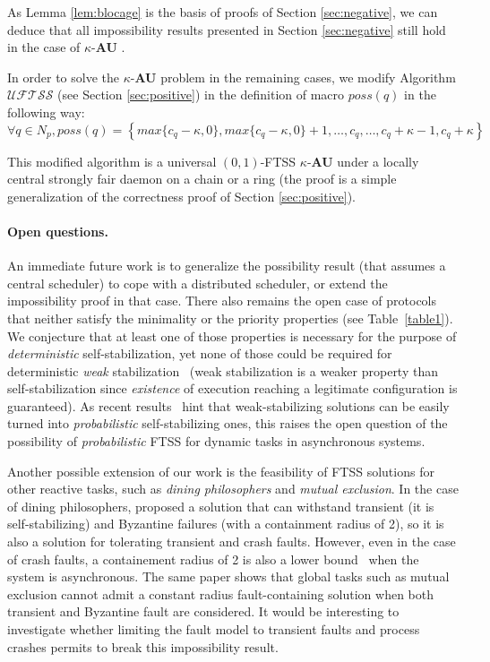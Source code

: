 \documentclass[11pt,english,letterpaper]{article}
\begin{document}
As Lemma \ref{lem:blocage} is the basis of proofs of Section \ref{sec:negative}, we can deduce that all impossibility results presented in Section \ref{sec:negative} still hold in the case of $\kappa$-\textbf{AU} .

In order to solve the $\kappa$-\textbf{AU} problem in the remaining cases, we modify Algorithm $\mathcal{UFTSS}$ (see Section \ref{sec:positive}) in the definition of macro $poss(q)$ in the following way:
\[\forall q\in N_{p}, poss(q)=\left\{max\{c_q-\kappa,0\},max\{c_q-\kappa,0\}+1,\ldots,c_q,\ldots,c_q+\kappa-1,c_q+\kappa\right\}\]

This modified algorithm is a universal $(0,1)$-FTSS $\kappa$-\textbf{AU} under a locally central strongly fair daemon on a chain or a ring (the proof is a simple generalization of the correctness proof of Section \ref{sec:positive}).

\paragraph{Open questions.} An immediate future work is to generalize the possibility result (that assumes a central scheduler) to cope with a distributed scheduler, or extend the impossibility proof in that case. There also remains the open case of protocols that neither satisfy the minimality or the priority properties (see Table~\ref{table1}). We conjecture that at least one of those properties is necessary for the purpose of \emph{deterministic} self-stabilization, yet none of those could be required for deterministic \emph{weak} stabilization~\cite{G01cb} (weak stabilization is a weaker property than self-stabilization since \emph{existence} of execution reaching a legitimate configuration is guaranteed). As recent results~\cite{DTY08c} hint that weak-stabilizing solutions can be easily turned into \emph{probabilistic} self-stabilizing ones, this raises the open question of the possibility of \emph{probabilistic} FTSS for dynamic tasks in asynchronous systems.

Another possible extension of our work is the feasibility of FTSS solutions for other reactive tasks, such as \emph{dining philosophers} and \emph{mutual exclusion}. In the case of dining philosophers, \cite{NA02c} proposed a solution that can withstand transient (it is self-stabilizing) and Byzantine failures (with a containment radius of 2), so it is also a solution for tolerating transient and crash faults. However, even in the case of crash faults, a containement radius of 2 is also a lower bound~\cite{PS04c} when the system is asynchronous. The same paper \cite{NA02c} shows that global tasks such as mutual exclusion cannot admit a constant radius fault-containing solution when both transient and Byzantine fault are considered. It would be interesting to investigate whether limiting the fault model to transient faults and process crashes permits to break this impossibility result.



\end{document}
